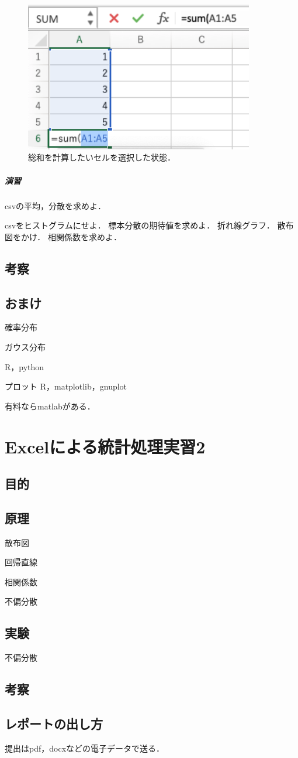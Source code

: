 \documentclass[12pt, a4j]{jreport}
\begin{document}
\begin{figure}[htbp]
  \includegraphics[width=10cm]{sum.png}
  \caption{総和を計算したいセルを選択した状態．}
  \label{fig:sum}
\end{figure}


\paragraph{演習}
csvの平均，分散を求めよ．

csvをヒストグラムにせよ．
標本分散の期待値を求めよ．
折れ線グラフ．
散布図をかけ．
相関係数を求めよ．

\section{考察}

\section{おまけ}

確率分布

ガウス分布

R，python

プロット
R，matplotlib，gnuplot


有料ならmatlabがある．

\chapter{Excelによる統計処理実習2}

\section{目的}

\section{原理}

散布図

回帰直線

相関係数

不偏分散

\section{実験}

不偏分散

\section{考察}


\section{レポートの出し方}

提出はpdf，docxなどの電子データで送る．
\end{document}
